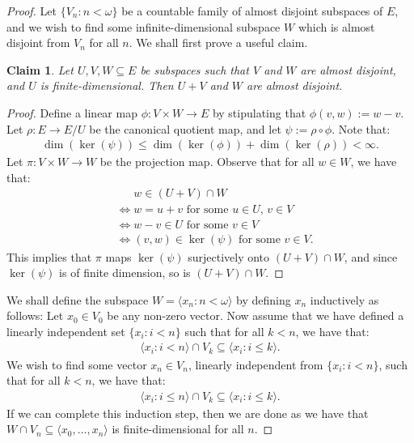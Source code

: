 \documentclass[10pt,a4paper]{amsart}
\theoremstyle{plain}
\numberwithin{equation}{section}
\newtheorem{claim}{Claim}
\theoremstyle{definition}
\renewcommand{\c}[1]{\langle #1 \rangle}
\newcommand{\iffbreak}{\phantom{{} \iff {}}}
\newenvironment{midproof}[1][Proof]
  {\begin{proof}[#1]\renewcommand{\qedsymbol}{$\blacksquare$}}
  {\end{proof}}
\begin{document}
\begin{proof}
    Let $\{V_n : n < \omega\}$ be a countable family of almost disjoint subspaces of $E$, and we wish to find some infinite-dimensional subspace $W$ which is almost disjoint from $V_n$ for all $n$. We shall first prove a useful claim.

    \begin{claim}
    \label{claim:finite-dimensional.addition}
        Let $U,V,W \subseteq E$ be subspaces such that $V$ and $W$ are almost disjoint, and $U$ is finite-dimensional. Then $U + V$ and $W$ are almost disjoint.
    \end{claim}

    \begin{midproof}
        Define a linear map $\phi : V \times W \to E$ by stipulating that $\phi(v,w) := w - v$. Let $\rho : E \to E/U$ be the canonical quotient map, and let $\psi := \rho \circ \phi$. Note that:
        \begin{align*}
            \dim(\ker(\psi)) \leq \dim(\ker(\phi)) + \dim(\ker(\rho)) < \infty.
        \end{align*}    
        Let $\pi : V \times W \to W$ be the projection map. Observe that for all $w \in W$, we have that:
        \begin{align*}
            &\iffbreak w \in (U + V) \cap W \\
            &\iff w = u + v \text{ for some $u \in U$, $v \in V$} \\
            &\iff w - v \in U \text{ for some $v \in V$} \\
            &\iff (v,w) \in \ker(\psi) \text{ for some $v \in V$}.
        \end{align*}
        This implies that $\pi$ maps $\ker(\psi)$ surjectively onto $(U + V) \cap W$, and since $\ker(\psi)$ is of finite dimension, so is $(U + V) \cap W$.
    \end{midproof}

    We shall define the subspace $W = \c{x_n : n < \omega}$ by defining $x_n$ inductively as follows: Let $x_0 \in V_0$ be any non-zero vector. Now assume that we have defined a linearly independent set $\{x_i : i < n\}$ such that for all $k < n$, we have that:
    \begin{align*}
        \c{x_i : i < n} \cap V_k \subseteq \c{x_i : i \leq k}.
    \end{align*}
    We wish to find some vector $x_n \in V_n$, linearly independent from $\{x_i : i < n\}$, such that for all $k < n$, we have that:
    \begin{align*}
        \c{x_i : i \leq n} \cap V_k \subseteq \c{x_i : i \leq k}.
    \end{align*}
    If we can complete this induction step, then we are done as we have that $W \cap V_n \subseteq \c{x_0,\dots,x_n}$ is finite-dimensional for all $n$.
    

\end{proof}
\end{document}
